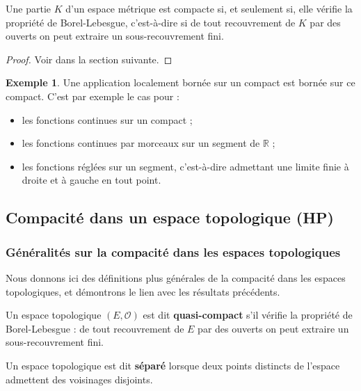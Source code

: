 \documentclass[french]{article}
\newcommand{\R}{\mathbb{R}}
\theoremstyle{plain}
\theoremstyle{definition}
\newtheorem*{ex}{Exemple}
\theoremstyle{remark}
\begin{document}
\begin{thm}%
	Une partie $K$ d'un espace métrique est compacte si, et seulement si, elle vérifie la propriété de Borel-Lebesgue, c'est-à-dire si de tout recouvrement de $K$ par des ouverts on peut extraire un sous-recouvrement fini.
\end{thm}
\begin{proof}
	Voir dans la section suivante.
\end{proof}

\begin{ex}
	Une application localement bornée sur un compact est bornée sur ce compact. C'est par exemple le cas pour :
	\begin{itemize}
		\item les fonctions continues sur un compact ;
		\item les fonctions continues par morceaux sur un segment de $\R$ ;
		\item les fonctions réglées sur un segment, c'est-à-dire admettant une limite finie à droite et à gauche en tout point.
	\end{itemize}
\end{ex}

\subsection{Compacité dans un espace topologique (HP)}

\subsubsection*{Généralités sur la compacité dans les espaces topologiques}

Nous donnons ici des définitions plus générales de la compacité dans les espaces topologiques, et démontrons le lien avec les résultats précédents.

\begin{dfn}
	Un espace topologique $(E,\mathcal{O})$ est dit \textbf{quasi-compact} s'il vérifie la propriété de Borel-Lebesgue : de tout recouvrement de $E$ par des ouverts on peut extraire un sous-recouvrement fini.
\end{dfn}

\begin{dfn}
	Un espace topologique est dit \textbf{séparé} lorsque deux points distincts de l'espace admettent des voisinages disjoints.
\end{dfn}
\end{document}
